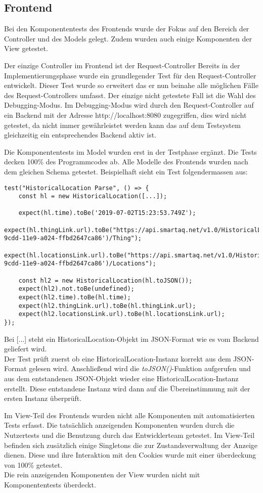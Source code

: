 \subsection{Frontend}
Bei den Komponententests des Frontends wurde der Fokus auf den Bereich der Controller und des Models gelegt.
Zudem wurden auch einige Komponenten der View getestet.

Der einzige Controller im Frontend ist der Request-Controller
Bereits in der Implementierungsphase wurde ein grundlegender Test für den Request-Controller entwickelt.
Dieser Test wurde so erweitert das er nun beinahe alle möglichen Fälle des Request-Controllers umfasst.
Der einzige nicht getestete Fall ist die Wahl des Debugging-Modus.
Im Debugging-Modus wird durch den Request-Controller auf ein Backend mit der Adresse http://localhost:8080 zugegriffen, dies wird nicht getestet, da nicht immer gewährleistet werden kann das auf dem Testsystem gleichzeitig ein entsprechendes Backend aktiv ist.

Die Komponententests im Model wurden erst in der Testphase ergänzt.
Die Tests decken 100\% des Programmcodes ab.
Alle Modelle des Frontends wurden nach dem gleichen Schema getestet.
Beispielhaft sieht ein Test folgendermassen aus:
\begin{lstlisting}[style=customjs]
test("HistoricalLocation Parse", () => {
    const hl = new HistoricalLocation([...]);

    expect(hl.time).toBe('2019-07-02T15:23:53.749Z');
    expect(hl.thingLink.url).toBe("https://api.smartaq.net/v1.0/HistoricalLocations('66c68826-9cdd-11e9-a024-ffbd2647ca86')/Thing");
    expect(hl.locationsLink.url).toBe("https://api.smartaq.net/v1.0/HistoricalLocations('66c68826-9cdd-11e9-a024-ffbd2647ca86')/Locations");

    const hl2 = new HistoricalLocation(hl.toJSON());
    expect(hl2).not.toBe(undefined);
    expect(hl2.time).toBe(hl.time);
    expect(hl2.thingLink.url).toBe(hl.thingLink.url);
    expect(hl2.locationsLink.url).toBe(hl.locationsLink.url);
});
\end{lstlisting}
Bei [...] steht ein HistoricalLocation-Objekt im \gls{JSON}-Format wie es vom Backend geliefert wird.
\\
Der Test prüft zuerst ob eine HistoricalLocation-Instanz korrekt aus dem \gls{JSON}-Format gelesen wird.
Anschließend wird die \textit{toJSON()}-Funktion aufgerufen und aus dem entstandenen JSON-Objekt wieder eine HistoricalLocation-Instanz erstellt.
Diese entstandene Instanz wird dann auf die Übereinstimmung mit der ersten Instanz überprüft.

Im View-Teil des Frontends wurden nicht alle Komponenten mit automatisierten Tests erfasst.
Die tatsächlich anzeigenden Komponenten wurden durch die Nutzertests und die Benutzung durch das Entwicklerteam getestet.
Im View-Teil befinden sich zusätzlich einige Singletons die zur Zustandsverwaltung der Anzeige dienen.
Diese und ihre Interaktion mit den Cookies wurde mit einer überdeckung von 100\% getestet.
\\
Die rein anzeigenden Komponenten der View wurden nicht mit Komponententests überdeckt. 